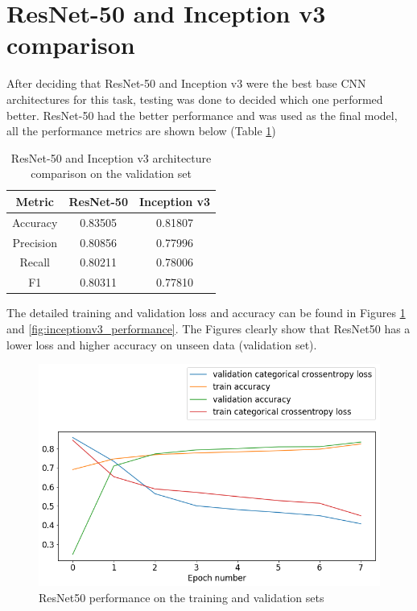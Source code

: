 \documentclass[times, utf8, diplomski]{fer}
\begin{document}
\section{ResNet-50 and Inception v3 comparison}
\label{se:resnet_vs_inception}

After deciding that ResNet-50 and Inception v3 were the best base CNN architectures for this task, testing was done to decided which one performed better. ResNet-50 had the better performance and was used as the final model, all the performance metrics are shown below (Table \ref{tb:resnet_vs_inceptionv3})

\begin{table}
\centering
\caption{ResNet-50 and Inception v3 architecture comparison on the validation set}
\label{tb:resnet_vs_inceptionv3}
\begin{tabular}{ccc}
\hline 
Metric & ResNet-50 & Inception v3 \\ \hline 
Accuracy & 0.83505 & 0.81807 \\ 
Precision & 0.80856 & 0.77996 \\ 
Recall & 0.80211 & 0.78006 \\
F1 & 0.80311 &  0.77810 \\
\hline 
\end{tabular} 
\end{table}

The detailed training and validation loss and accuracy can be found in Figures \ref{fig:resnet_performance} and \ref{fig:inceptionv3_performance}. The Figures clearly show that ResNet50 has a lower loss and higher accuracy on unseen data (validation set).

\begin{figure}
  \includegraphics[scale=0.61]{figures/resnet_performance.png}
  \centering
  \caption{ResNet50 performance on the training and validation sets}
  \label{fig:resnet_performance}
\end{figure}
\end{document}
